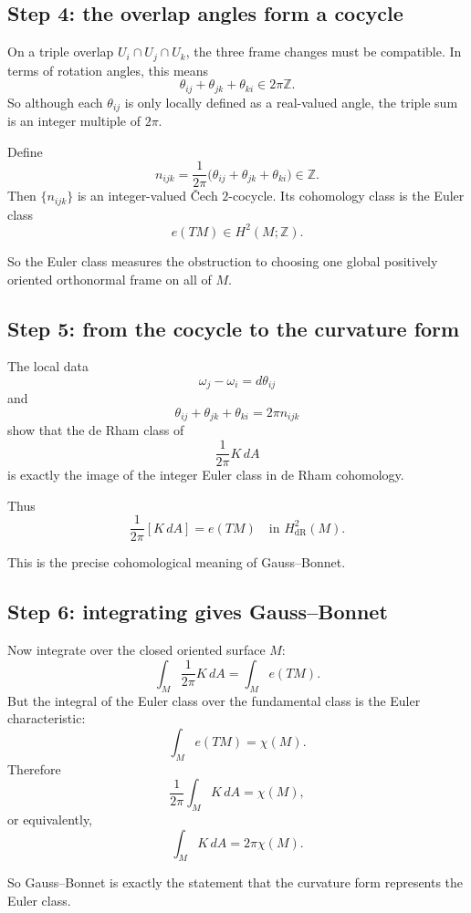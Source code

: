\documentclass[11pt]{article}
\begin{document}
	\subsection*{Step 4: the overlap angles form a cocycle}
	
	On a triple overlap \(U_i\cap U_j\cap U_k\), the three frame changes must be compatible. In terms of rotation angles, this means
	\[
	\theta_{ij}+\theta_{jk}+\theta_{ki}\in 2\pi\mathbb{Z}.
	\]
	So although each \(\theta_{ij}\) is only locally defined as a real-valued angle, the triple sum is an integer multiple of \(2\pi\).
	
	Define
	\[
	n_{ijk}
	=
	\frac{1}{2\pi}\bigl(\theta_{ij}+\theta_{jk}+\theta_{ki}\bigr)\in \mathbb{Z}.
	\]
	Then \(\{n_{ijk}\}\) is an integer-valued \v{C}ech \(2\)-cocycle. Its cohomology class is the Euler class
	\[
	e(TM)\in H^2(M;\mathbb{Z}).
	\]
	
	So the Euler class measures the obstruction to choosing one global positively oriented orthonormal frame on all of \(M\).
	
	\subsection*{Step 5: from the cocycle to the curvature form}
	
	The local data
	\[
	\omega_j-\omega_i = d\theta_{ij}
	\]
	and
	\[
	\theta_{ij}+\theta_{jk}+\theta_{ki}=2\pi n_{ijk}
	\]
	show that the de Rham class of
	\[
	\frac{1}{2\pi}K\,dA
	\]
	is exactly the image of the integer Euler class in de Rham cohomology.
	
	Thus
	\[
	\boxed{
		\frac{1}{2\pi}[K\,dA]=e(TM)\quad \text{in }H^2_{\mathrm{dR}}(M).
	}
	\]
	
	This is the precise cohomological meaning of Gauss--Bonnet.
	
	\subsection*{Step 6: integrating gives Gauss--Bonnet}
	
	Now integrate over the closed oriented surface \(M\):
	\[
	\int_M \frac{1}{2\pi}K\,dA
	=
	\int_M e(TM).
	\]
	But the integral of the Euler class over the fundamental class is the Euler characteristic:
	\[
	\int_M e(TM)=\chi(M).
	\]
	Therefore
	\[
	\frac{1}{2\pi}\int_M K\,dA = \chi(M),
	\]
	or equivalently,
	\[
	\boxed{
		\int_M K\,dA = 2\pi\chi(M).
	}
	\]
	
	So Gauss--Bonnet is exactly the statement that the curvature form represents the Euler class.
	
\end{document}

